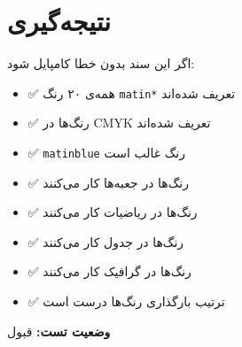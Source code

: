 \documentclass{matinbook}
\begin{document}
\section{نتیجه‌گیری}
\label{sec:conclusion}

اگر این سند بدون خطا کامپایل شود:

\begin{itemize}
    \item ✅ همه‌ی ۲۰ رنگ \texttt{matin*} تعریف شده‌اند
    \item ✅ رنگ‌ها در CMYK تعریف شده‌اند
    \item ✅ \texttt{matinblue} رنگ غالب است
    \item ✅ رنگ‌ها در جعبه‌ها کار می‌کنند
    \item ✅ رنگ‌ها در ریاضیات کار می‌کنند
    \item ✅ رنگ‌ها در جدول کار می‌کنند
    \item ✅ رنگ‌ها در گرافیک کار می‌کنند
    \item ✅ ترتیب بارگذاری رنگ‌ها درست است
\end{itemize}

\textbf{وضعیت تست:} قبول
\end{document}
